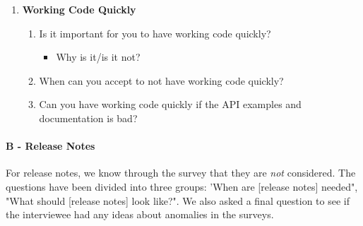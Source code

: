 \documentclass{article}
\begin{document}
\begin{enumerate}[label={A\Alph*}]
\item\textbf{Working Code Quickly}
\begin{enumerate}[label={AD\arabic*}]
\item Is it important for you to have working code quickly?
\begin{itemize}[label={-}]
\item Why is it/is it not?
\end{itemize}
\item When can you accept to not have working code quickly?
\item Can you have working code quickly if the API examples and documentation is bad?
\end{enumerate}
\end{enumerate}

\paragraph{B - Release Notes}
For release notes, we know through the survey that they are \textit{not} considered.
The questions have been divided into three groups: 'When are [release notes] needed",
"What should [release notes] look like?". We also asked a final question to see if the interviewee had any ideas about anomalies in the surveys.
\end{document}
